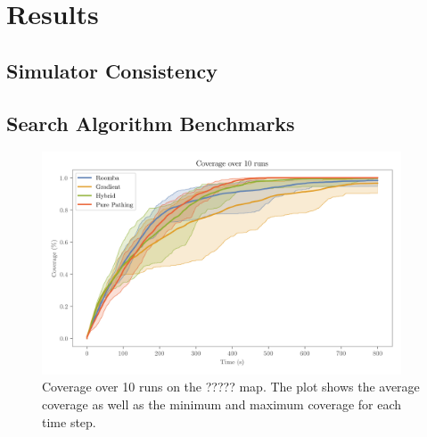 \section{Results}
\label{sec:results}


\subsection{Simulator Consistency}

\subsection{Search Algorithm Benchmarks}

\begin{figure}[H]
    \begin{center}
        \includegraphics[width=0.95\textwidth]{./figures/plots/benchmarks/coverage-over-10-runs.png}
    \end{center}
    \caption{Coverage over 10 runs on the {\color{red}?????} map. The plot shows the average coverage as well as the minimum and maximum coverage for each time step.}
    \label{fig:coverage-benchmark}
\end{figure}



